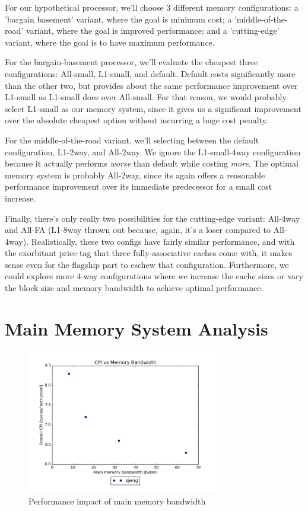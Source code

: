 \documentclass{article}
\begin{document}
For our hypothetical processor, we'll choose 3 different memory configurations:
a 'bargain basement' variant, where the goal is minimum cost; a
'middle-of-the-road' variant, where the goal is improved performance; and a
'cutting-edge' variant, where the goal is to have maximum performance.

For the bargain-basement processor, we'll evaluate the cheapest three
configurations: All-small, L1-small, and default. Default costs significantly
more than the other two, but provides about the same performance improvement
over L1-small as L1-small does over All-small. For that reason, we would
probably select L1-small as our memory system, since it gives us a significant
improvement over the absolute cheapest option without incurring a huge cost
penalty.

For the middle-of-the-road variant, we'll selecting between the default
configuration, L1-2way, and All-2way. We ignore the L1-small-4way configuration
because it actually performs \emph{worse} than default while costing
\emph{more}. The optimal memory system is probably All-2way, since its again
offers a reasonable performance improvement over its immediate predecessor for a
small cost increase.

Finally, there's only really two possibilities for the cutting-edge variant:
All-4way and All-FA (L1-8way thrown out because, again, it's a loser compared to
All-4way). Realistically, these two configs have fairly similar performance, and
with the exorbitant price tag that three fully-associative caches come with,
it makes sense even for the flagship part to eschew that configuration.
Furthermore, we could explore more 4-way configurations where we increase the
cache sizes or vary the block size and memory bandwidth to achieve optimal
performance.

\section{Main Memory System Analysis}

\begin{figure}[ht]
    \centering
    \includegraphics[width=0.75\textwidth]{plots/CPI_vs_Bandwidth.png}
    \caption{Performance impact of main memory bandwidth}
    \label{fig:cpivsband}
\end{figure}
\end{document}
